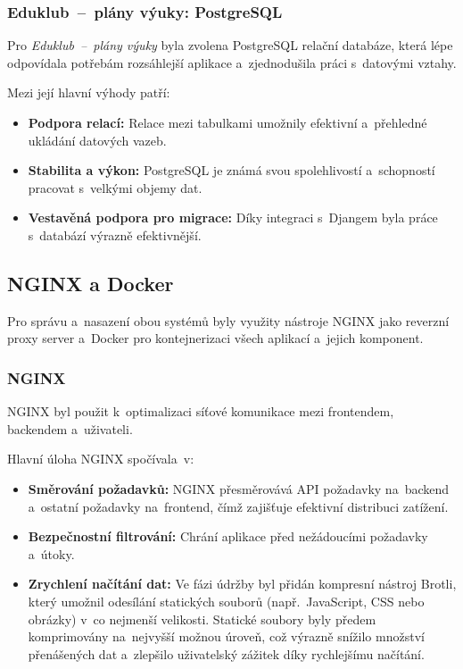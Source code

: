 \documentclass[male,czech,api_bc]{kitheses}
\begin{document}
\subsubsection{Eduklub~--~plány výuky: PostgreSQL}

Pro \textit{Eduklub~--~plány výuky} byla zvolena PostgreSQL relační databáze, která lépe odpovídala potřebám rozsáhlejší aplikace a~zjednodušila práci s~datovými vztahy.

Mezi její hlavní výhody patří:
\begin{itemize}
	\item \textbf{Podpora relací:} Relace mezi tabulkami umožnily efektivní a~přehledné ukládání datových vazeb.
	\item \textbf{Stabilita a výkon:} PostgreSQL je známá svou spolehlivostí a~schopností pracovat s~velkými objemy dat.
	\item \textbf{Vestavěná podpora pro migrace:} Díky integraci s~Djangem byla práce s~databází výrazně efektivnější.
\end{itemize}

\subsection{NGINX a Docker}

Pro správu a~nasazení obou systémů byly využity nástroje NGINX jako reverzní proxy server a~Docker pro kontejnerizaci všech aplikací a~jejich komponent.

\subsubsection{NGINX}

NGINX byl použit k~optimalizaci síťové komunikace mezi frontendem, backendem a~uživateli.

Hlavní úloha NGINX spočívala~v:
\begin{itemize}
	\item \textbf{Směrování požadavků:} NGINX přesměrovává API požadavky na~backend a~ostatní požadavky na~frontend, čímž zajišťuje efektivní distribuci zatížení.
	\item \textbf{Bezpečnostní filtrování:} Chrání aplikace před nežádoucími požadavky a~útoky.
	\item \textbf{Zrychlení načítání dat:} Ve fázi údržby byl přidán kompresní nástroj Brotli, který umožnil odesílání statických souborů (např.~JavaScript, CSS nebo obrázky) v~co nejmenší velikosti. Statické soubory byly předem komprimovány na~nejvyšší možnou úroveň, což výrazně snížilo množství přenášených dat a~zlepšilo uživatelský zážitek díky rychlejšímu načítání.
\end{itemize}
\end{document}
